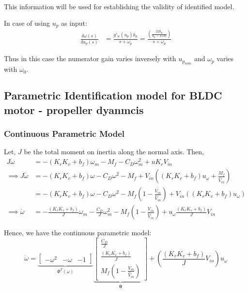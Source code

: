 This information will be used for establishing the validity of identified model.

In case of using $u_p$ as input:
\begin{align*}
    \frac{\delta \omega(s)}{\delta u_p(s)} &= \frac{g'_w (u_p) k_p}{s + \omega_p} = \frac{\left(\frac{22 k_p}{u_p - 1110}\right)}{s + \omega_p}
\end{align*}

Thus in this case the numerator gain varies inversely with $u_{p_{nom}}$ and $\omega_p$ varies with $\omega_0$.

\subsection{Parametric Identification model for BLDC motor - propeller dyanmcis}
\subsubsection{Continuous Parametric Model}
Let, $J$ be the total moment on inertia along the normal axis. Then,
\begin{align*}
    J \dot \omega &= -(K_rK_v + b_f) \omega_m - M_f - C_D \omega_m^2 + u K_r V_{in}\\
    \implies J\dot \omega &= -(K_rK_v + b_f) \omega - C_D \omega^2 - M_f + V_{in} \left((K_r K_v  + b_f) u_\omega + \frac{M_f}{\hat V_{in}} \right)\\
        &= -(K_rK_v + b_f) \omega - C_D \omega^2 - M_f \left( 1 - \frac{V_{in}}{\hat V_{in}}\right) + V_{in} \left((K_r K_v  + b_f) u_\omega  \right)\\
    \implies \dot \omega &= -\frac{(K_rK_v + b_f)}{J} \omega_m - \frac{C_D}{J} \omega_m^2 - M_f \left( 1 - \frac{V_{in}}{\hat V_{in}}\right) + u_\omega \frac{(K_rK_v + b_f)}{J} V_{in}
\end{align*}

Hence, we have the continuous parametric model:
$$ \dot \omega =
    \underbrace{\begin{bmatrix}
    - \omega^2 & - \omega  & -1
\end{bmatrix}}_{\Phi^T(\omega)}
\underbrace{\begin{bmatrix}
    \frac{C_{D}}{J} \\
    \frac{(K_rK_v + b_f)}{J}  \\
    M_f \left( 1 - \frac{V_{in}}{\hat V_{in}}\right)
\end{bmatrix} }_{\pmb \theta}
    +\left(\frac{(K_rK_v + b_f)}{J} V_{in}\right) u_{\omega}
 $$

